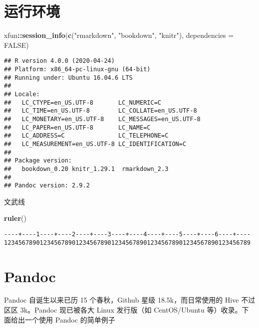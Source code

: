 \documentclass[
  lang=cn,
  11pt,
  scheme=chinese,
  chinesefont=nofont,
  bibstyle=apalike]{elegantbook}
\newenvironment{Shaded}{\begin{snugshade}}{\end{snugshade}}
\newcommand{\DataTypeTok}[1]{\textcolor[rgb]{0.13,0.29,0.53}{#1}}
\newcommand{\KeywordTok}[1]{\textcolor[rgb]{0.13,0.29,0.53}{\textbf{#1}}}
\newcommand{\NormalTok}[1]{#1}
\newcommand{\OperatorTok}[1]{\textcolor[rgb]{0.81,0.36,0.00}{\textbf{#1}}}
\newcommand{\OtherTok}[1]{\textcolor[rgb]{0.56,0.35,0.01}{#1}}
\newcommand{\StringTok}[1]{\textcolor[rgb]{0.31,0.60,0.02}{#1}}
\begin{document}
\hypertarget{session-info}{%
\section{运行环境}\label{session-info}}

\begin{Shaded}
\begin{Highlighting}[]
\NormalTok{xfun}\OperatorTok{::}\KeywordTok{session\_info}\NormalTok{(}\KeywordTok{c}\NormalTok{(}\StringTok{"rmarkdown"}\NormalTok{, }\StringTok{"bookdown"}\NormalTok{, }\StringTok{"knitr"}\NormalTok{), }\DataTypeTok{dependencies =} \OtherTok{FALSE}\NormalTok{)}
\end{Highlighting}
\end{Shaded}

\begin{verbatim}
## R version 4.0.0 (2020-04-24)
## Platform: x86_64-pc-linux-gnu (64-bit)
## Running under: Ubuntu 16.04.6 LTS
## 
## Locale:
##   LC_CTYPE=en_US.UTF-8       LC_NUMERIC=C              
##   LC_TIME=en_US.UTF-8        LC_COLLATE=en_US.UTF-8    
##   LC_MONETARY=en_US.UTF-8    LC_MESSAGES=en_US.UTF-8   
##   LC_PAPER=en_US.UTF-8       LC_NAME=C                 
##   LC_ADDRESS=C               LC_TELEPHONE=C            
##   LC_MEASUREMENT=en_US.UTF-8 LC_IDENTIFICATION=C       
## 
## Package version:
##   bookdown_0.20 knitr_1.29.1  rmarkdown_2.3
## 
## Pandoc version: 2.9.2
\end{verbatim}

文武线

\begin{Shaded}
\begin{Highlighting}[]
\KeywordTok{ruler}\NormalTok{()}
\end{Highlighting}
\end{Shaded}

\begin{verbatim}
----+----1----+----2----+----3----+----4----+----5----+----6----+----
123456789012345678901234567890123456789012345678901234567890123456789
\end{verbatim}

\hypertarget{pandoc}{%
\section{Pandoc}\label{pandoc}}

Pandoc 自诞生以来已历 15 个春秋，Github 星级 18.5k，而日常使用的 Hive 不过区区 3k。Pandoc 现已被各大 Linux 发行版（如 CentOS/Ubuntu 等）收录。下面给出一个使用 Pandoc 的简单例子
\end{document}
